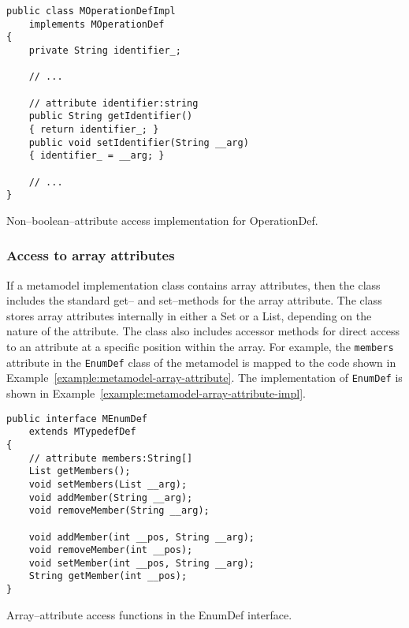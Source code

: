 \begin{Example}
\begin{minifbox}
\begin{small}
\begin{verbatim}
public class MOperationDefImpl
    implements MOperationDef
{
    private String identifier_;

    // ...

    // attribute identifier:string
    public String getIdentifier()
    { return identifier_; }
    public void setIdentifier(String __arg)
    { identifier_ = __arg; }

    // ...
}
\end{verbatim}
\end{small}
\end{minifbox}
\caption{Non--boolean--attribute access implementation for OperationDef.}
\label{example:metamodel-non-boolean-attribute-impl}
\end{Example}

\subsubsection{Access to array attributes}

If a metamodel implementation class contains array attributes, then the class
includes the standard get-- and set--methods for the array attribute. The class
stores array attributes internally in either a Set or a List, depending on the
nature of the attribute. The class also includes accessor methods for direct
access to an attribute at a specific position within the array. For example, the
{\tt members} attribute in the {\tt EnumDef} class of the metamodel is mapped to
the code shown in Example~\ref{example:metamodel-array-attribute}. The
implementation of {\tt EnumDef} is shown in
Example~\ref{example:metamodel-array-attribute-impl}.

\begin{Example}
\begin{minifbox}
\begin{small}
\begin{verbatim}
public interface MEnumDef
    extends MTypedefDef
{
    // attribute members:String[]
    List getMembers();
    void setMembers(List __arg);
    void addMember(String __arg);
    void removeMember(String __arg);

    void addMember(int __pos, String __arg);
    void removeMember(int __pos);
    void setMember(int __pos, String __arg);
    String getMember(int __pos);
}
\end{verbatim}
\end{small}
\end{minifbox}
\caption{Array--attribute access functions in the EnumDef interface.}
\label{example:metamodel-array-attribute}
\end{Example}

